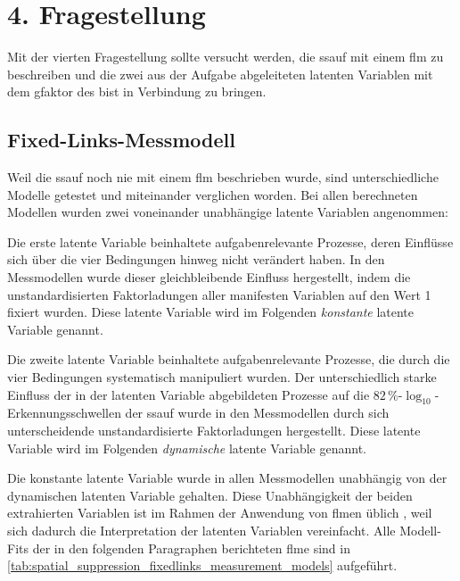 \documentclass[11pt, twoside, a4paper]{book}		%
\begin{document}
\section{4. Fragestellung \label{sec:4Fragestellung}}

Mit der vierten Fragestellung sollte versucht werden, die \gls{ssauf} mit einem \gls{flm} zu beschreiben und die zwei aus der Aufgabe abgeleiteten latenten Variablen mit dem \gls{gfaktor} des \gls{bist} in Verbindung zu bringen.


\subsection{Fixed-Links-Messmodell \label{subsec:spatial_suppression_fixed_links_messmodell}}

Weil die \gls{ssauf} noch nie mit einem \gls{flm} beschrieben wurde, sind unterschiedliche Modelle getestet und miteinander verglichen worden. Bei allen berechneten Modellen wurden zwei voneinander unabhängige latente Variablen angenommen: 

Die erste latente Variable beinhaltete aufgabenrelevante Prozesse, deren Einflüsse sich über die vier Bedingungen hinweg nicht verändert haben. In den Messmodellen wurde dieser gleichbleibende Einfluss hergestellt, indem die unstandardisierten Faktorladungen aller manifesten Variablen auf den Wert 1 fixiert wurden. Diese latente Variable wird im Folgenden \textit{konstante} latente Variable genannt. 

Die zweite latente Variable beinhaltete aufgabenrelevante Prozesse, die durch die vier Bedingungen systematisch manipuliert wurden. Der unterschiedlich starke Einfluss der in der latenten Variable abgebildeten Prozesse auf die $82\,\%$-$\log_{10}$-Er\-ken\-nungs\-schwel\-len der \gls{ssauf} wurde in den Messmodellen durch sich unterscheidende unstandardisierte Faktorladungen hergestellt. Diese latente Variable wird im Folgenden \textit{dynamische} latente Variable genannt.

Die konstante latente Variable wurde in allen Messmodellen unabhängig von der dynamischen latenten Variable gehalten. Diese Unabhängigkeit der beiden extrahierten Variablen ist im Rahmen der Anwendung von \gls{flm}en üblich \citep[z.B.][]{Wagner2014, Schweizer2007, Wang2015}, weil sich dadurch die Interpretation der latenten Variablen vereinfacht.
Alle Modell-Fits der in den folgenden Paragraphen berichteten \gls{flm}e sind in \autoref{tab:spatial_suppression_fixedlinks_measurement_models} aufgeführt.
\end{document}
